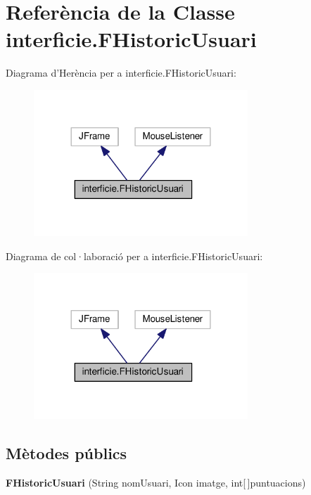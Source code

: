 \hypertarget{classinterficie_1_1_f_historic_usuari}{\section{Referència de la Classe interficie.\+F\+Historic\+Usuari}
\label{classinterficie_1_1_f_historic_usuari}
}


Diagrama d'Herència per a interficie.\+F\+Historic\+Usuari\+:\nopagebreak
\begin{figure}[H]
\begin{center}
\leavevmode
\includegraphics[width=228pt]{classinterficie_1_1_f_historic_usuari__inherit__graph}
\end{center}
\end{figure}


Diagrama de col·laboració per a interficie.\+F\+Historic\+Usuari\+:\nopagebreak
\begin{figure}[H]
\begin{center}
\leavevmode
\includegraphics[width=228pt]{classinterficie_1_1_f_historic_usuari__coll__graph}
\end{center}
\end{figure}
\subsection*{Mètodes públics}
\begin{DoxyCompactItemize}
\item 
\hypertarget{classinterficie_1_1_f_historic_usuari_a7dae2cb499c3aeade25895dcbfd42c24}{{\bfseries F\+Historic\+Usuari} (String nom\+Usuari, Icon imatge, int\mbox{[}$\,$\mbox{]}puntuacions)}\label{classinterficie_1_1_f_historic_usuari_a7dae2cb499c3aeade25895dcbfd42c24}

\end{DoxyCompactItemize}


